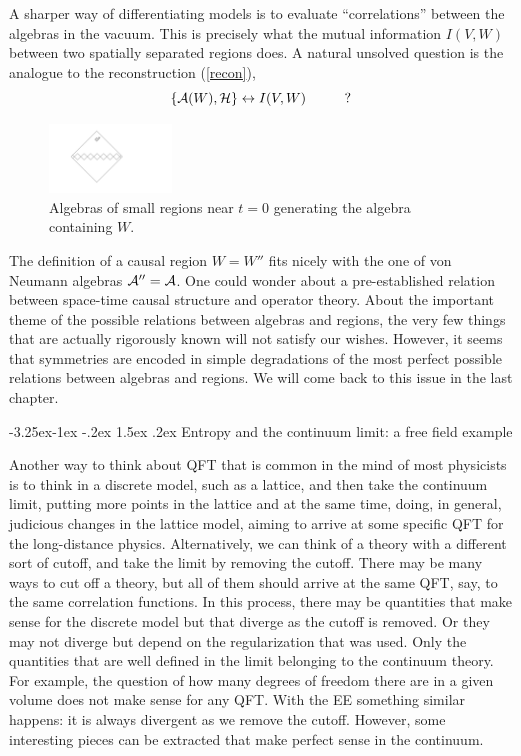 \documentclass[11pt]{article}
\makeatletter
\renewcommand\subsection{\@startsection{subsection}{2}{\z@}%
                                   {-3.25ex\@plus -1ex \@minus -.2ex}%
                                     {1.5ex \@plus .2ex}%
                                     {\normalfont\bfseries}}
\numberwithin{equation}{section}
\newcommand{\be}{\begin{equation}}
\newcommand{\ee}{\end{equation}}
\makeatother
\begin{document}
A sharper way of differentiating models is to evaluate ``correlations'' between the algebras in the vacuum. This is precisely what the mutual information $I(V,W)$ between two spatially separated regions does. A natural unsolved question is the analogue to the reconstruction (\ref{recon}),
\be
\{{\cal A}(W), {\cal H}\}\leftrightarrow I(V,W) \hspace{1cm}?  
\ee

\begin{figure}[t]
\begin{center}  
\includegraphics[width=0.29\textwidth]{causal1.pdf}
\captionsetup{width=0.9\textwidth}
\caption{Algebras of small regions near $t=0$ generating the algebra containing $W$.}
\label{causal1}
\end{center}  
\end{figure}

The definition of a causal region $W=W''$ fits nicely with the one of von Neumann algebras ${\cal A}''={\cal A}$.  One could wonder about a pre-established relation between space-time causal structure and operator theory. About the important theme of the possible relations between algebras and regions, the very few things that are actually rigorously known will not satisfy our wishes. However, it seems that symmetries are encoded in simple degradations of the most perfect possible relations between algebras and regions. We will come back to this issue in the last chapter.    

\subsection{Entropy and the continuum limit: a free field example}

Another way to think about QFT that is common in the mind of most physicists is to think in a discrete model, such as a lattice, and then take the continuum limit, putting more points in the lattice and at the same time, doing, in general, judicious changes in the lattice model,  aiming to arrive at some specific QFT for the long-distance physics. Alternatively, we can think of a theory with a different sort of cutoff, and take the limit by removing the cutoff. There may be many ways to cut off a theory, but all of them should arrive at the same QFT, say, to the same correlation functions. In this process, there may be quantities that make sense for the discrete model but that diverge as the cutoff is removed. Or they may not diverge but depend on the regularization that was used. Only the quantities that are well defined in the limit belonging to the continuum theory. For example, the question of how many degrees of freedom there are in a given volume does not make sense for any QFT. With the EE something similar happens: it is always divergent as we remove the cutoff. However, some interesting pieces can be extracted that make perfect sense in the continuum.    
\end{document}
